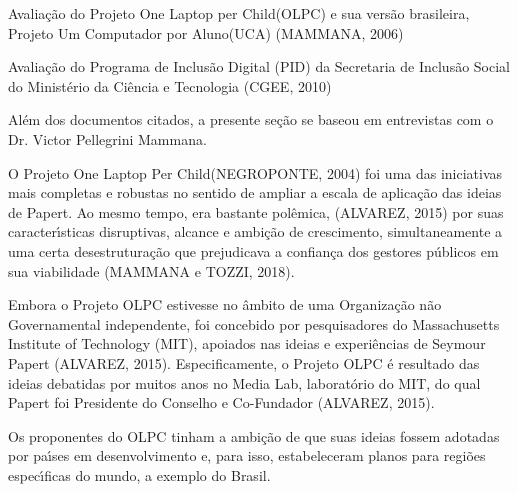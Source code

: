 \documentclass[
12pt,		%
openright,	%
twoside,  %
a4paper,			%
chapter=TITLE,		%
english,			%
french,				%
spanish,			%
brazil				%
]{USPSC-classe/USPSC}
\begin{document}
\begin{alineas}
\item Avalia\c{c}\~ao do Projeto \textquotedbl One Laptop per Child\textquotedbl  (OLPC) e sua vers\~ao brasileira, \textquotedbl Projeto Um Computador por Aluno\textquotedbl  (UCA) (MAMMANA, 2006)
\item Avalia\c{c}\~ao do Programa de Inclus\~ao Digital (PID) da Secretaria de Inclus\~ao Social do Minist\'erio da Ci\^encia e Tecnologia (CGEE, 2010)
\end{alineas}

Al\'em dos documentos citados, a presente se\c{c}\~ao se baseou em entrevistas com o Dr. Victor Pellegrini Mammana.









O Projeto \textquotedbl One Laptop Per Child\textquotedbl  (NEGROPONTE, 2004) foi uma das iniciativas mais completas e robustas no sentido de ampliar a escala de aplica\c{c}\~ao das ideias de Papert. Ao mesmo tempo, era bastante pol\^emica, (ALVAREZ, 2015) por suas caracter\'{\i}sticas disruptivas, alcance e ambi\c{c}\~ao de crescimento, simultaneamente a uma certa desestrutura\c{c}\~ao que prejudicava a confian\c{c}a dos gestores p\'ublicos em sua viabilidade (MAMMANA e TOZZI, 2018).









Embora o Projeto OLPC estivesse no \^ambito de uma Organiza\c{c}\~ao n\~ao Governamental independente,  foi concebido por pesquisadores do Massachusetts Institute of Technology (MIT), apoiados nas ideias e experi\^encias de Seymour Papert (ALVAREZ, 2015). Especificamente, o Projeto OLPC \'e resultado das ideias debatidas por muitos anos no Media Lab, laborat\'orio do MIT, do qual Papert foi Presidente do Conselho e Co-Fundador (ALVAREZ, 2015).









Os proponentes do OLPC tinham a ambi\c{c}\~ao de que suas ideias fossem adotadas por pa\'{\i}ses em desenvolvimento e, para isso, estabeleceram planos para regi\~oes espec\'{\i}ficas do mundo, a exemplo do Brasil.
\end{document}
